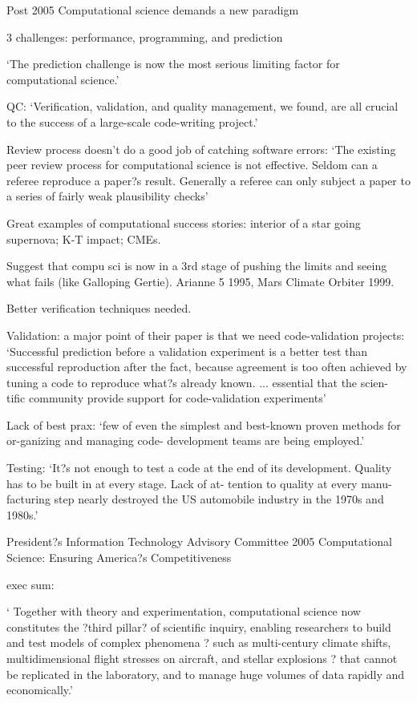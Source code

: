 \documentclass[12pt]{amsart}
\begin{document}
Post 2005 Computational science demands a new paradigm

3 challenges: performance, programming, and prediction

`The prediction challenge is now the most serious limiting factor for computational science.'

QC: `Verification, validation, and quality management, we found, are all crucial to the success of a large-scale code-writing project.'

Review process doesn't do a good job of catching software errors: `The existing peer review process for computational science is not effective. Seldom can a referee reproduce a paper?s result. Generally a referee can only subject a paper to a series of fairly weak plausibility checks'

Great examples of computational success stories: interior of a star going supernova; K-T impact; CMEs.

Suggest that compu sci is now in a 3rd stage of pushing the limits and seeing what fails (like Galloping Gertie). Arianne 5 1995, Mars Climate Orbiter 1999. 

Better verification techniques needed. 

Validation: a major point of their paper is that we need code-validation projects: `Successful prediction before a validation experiment is a better test than successful reproduction after the fact, because agreement is too often achieved by tuning a code to reproduce what?s already known. ...  essential that the scien- tific community provide support for code-validation experiments'

Lack of best prax: `few of even the simplest and best-known proven methods for or-ganizing and managing code- development teams are being employed.'

Testing: `It?s not enough to test a code at the end of its development. Quality has to be built in at every stage. Lack of at- tention to quality at every manu- facturing step nearly destroyed the US automobile industry in the 1970s and 1980s.'





President?s Information Technology Advisory Committee 2005 Computational Science:
Ensuring America?s Competitiveness

exec sum: 

` Together with theory and experimentation, computational science now constitutes the ?third pillar? of scientific inquiry, enabling researchers to build and test models of complex phenomena ? such as multi-century climate shifts, multidimensional flight stresses on aircraft, and stellar explosions ? that cannot be replicated in the laboratory, and to manage huge volumes of data rapidly and economically.'
\end{document}
